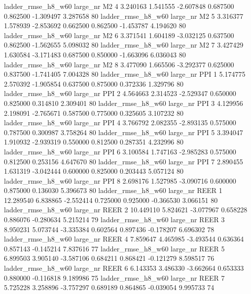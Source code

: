  ladder_rmse_h8_w60   large_nr       M2                 4  3.240163  1.541555  -2.607848 0.687500 0.862500 -1.309497    3.287658 80
 ladder_rmse_h8_w60   large_nr       M2                 5  3.316377  1.578939  -2.853692 0.662500 0.862500 -1.453787    4.194620 80
 ladder_rmse_h8_w60   large_nr       M2                 6  3.371541  1.604189  -3.032125 0.637500 0.862500 -1.562655    5.098032 80
 ladder_rmse_h8_w60   large_nr       M2                 7  3.427429  1.630584  -3.171483 0.687500 0.850000 -1.663096    6.036043 80
 ladder_rmse_h8_w60   large_nr       M2                 8  3.477090  1.665506  -3.292377 0.625000 0.837500 -1.741405    7.004328 80
 ladder_rmse_h8_w60   large_nr      PPI                 1  5.174775  2.570392  -1.905854 0.637500 0.875000  0.372336    1.329796 80
 ladder_rmse_h8_w60   large_nr      PPI                 2  4.564663  2.314523  -2.529347 0.650000 0.825000  0.314810    2.309401 80
 ladder_rmse_h8_w60   large_nr      PPI                 3  4.129956  2.198091  -2.765671 0.587500 0.775000  0.325605    3.107232 80
 ladder_rmse_h8_w60   large_nr      PPI                 4  3.766792  2.082355  -2.893135 0.575000 0.787500  0.300987    3.758264 80
 ladder_rmse_h8_w60   large_nr      PPI                 5  3.394047  1.910932  -2.939319 0.550000 0.812500  0.287351    4.232996 80
 ladder_rmse_h8_w60   large_nr      PPI                 6  3.100584  1.747163  -2.985283 0.575000 0.812500  0.253156    4.647670 80
 ladder_rmse_h8_w60   large_nr      PPI                 7  2.890455  1.631319  -3.042444 0.600000 0.825000  0.203443    5.057124 80
 ladder_rmse_h8_w60   large_nr      PPI                 8  2.698176  1.527985  -3.090716 0.600000 0.875000  0.136030    5.396673 80
 ladder_rmse_h8_w60   large_nr     REER                 1 12.289540  6.838865  -2.552414 0.725000 0.925000 -0.366530    3.066151 80
 ladder_rmse_h8_w60   large_nr     REER                 2 10.449110  5.824621  -3.077967 0.658228 0.886076 -0.280634    5.215214 79
 ladder_rmse_h8_w60   large_nr     REER                 3  8.950231  5.073744  -3.335384 0.602564 0.897436 -0.178207    6.696302 78
 ladder_rmse_h8_w60   large_nr     REER                 4  7.859647  4.465985  -3.493544 0.636364 0.857143 -0.145214    7.837616 77
 ladder_rmse_h8_w60   large_nr     REER                 5  6.899503  3.905140  -3.587106 0.684211 0.868421 -0.121279    8.598517 76
 ladder_rmse_h8_w60   large_nr     REER                 6  6.143353  3.486330  -3.662664 0.653333 0.880000 -0.116818    9.189986 75
 ladder_rmse_h8_w60   large_nr     REER                 7  5.725228  3.258896  -3.757297 0.689189 0.864865 -0.039054    9.995733 74
